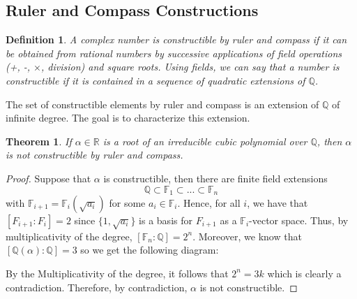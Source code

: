 \documentclass{article}
\newtheorem*{theorem}{Theorem}
\newtheorem*{definition}{Definition}
\newcommand{\R}{\mathbb{R}}
\newcommand{\Q}{\mathbb{Q}}
\newcommand{\F}{\mathbb{F}}
\begin{document}
\subsection{Ruler and Compass Constructions}

\begin{definition}
    A complex number is constructible by ruler and compass if it can be obtained from rational numbers by successive applications of field operations (+, -, $\times$, division) and square roots. Using fields, we can say that a number is constructible if it is contained in a sequence of quadratic extensions of $\Q$.
\end{definition}

The set of constructible elements by ruler and compass is an extension of $\Q$ of infinite degree. The goal is to characterize this extension.

\begin{theorem}
    If $\alpha \in \R$ is a root of an irreducible cubic polynomial over $\Q$, then $\alpha$ is not constructible by ruler and compass.
\end{theorem}

\begin{proof}
    Suppose that $\alpha$ is constructible, then there are finite field extensions 
    $$\Q \subset \F_1 \subset ... \subset \F_n$$
    with $\F_{i+1} = \F_i(\sqrt{a_i})$ for some $a_i \in \F_i$. Hence, for all $i$, we have that $[F_{i+1} : F_i] = 2$ since $\{1, \sqrt{a_i}\}$ is a basis for $F_{i+1}$ as a $\F_i$-vector space. Thus, by multiplicativity of the degree, $[\F_n : \Q] = 2^n$. Moreover, we know that $[\Q(\alpha) : \Q] = 3$ so we get the following diagram: 
    \begin{center}
    \end{center}
    By the Multiplicativity of the degree, it follows that $2^n = 3k$ which is clearly a contradiction. Therefore, by contradiction, $\alpha$ is not constructible. 
\end{proof}
\end{document}
